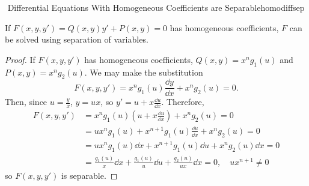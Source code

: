     \begin{theorem}{\Stop\,\,Differential Equations With Homogeneous Coefficients are Separable}{homodiffsep}
        
        If \(F(x,y,y')=Q(x,y)y'+P(x,y)=0\) has homogeneous coefficients, \(F\) can be solved using separation of variables.
        \begin{proof}
            If \(F(x,y,y')\) has homogeneous coefficients, \(Q(x,y)=x^ng_1(u)\) and \(P(x,y)=x^ng_2(u)\). We may make the substitution
            \begin{equation*}
                F(x,y,y')=x^ng_1(u)\frac{\dd y}{\dd x}+x^ng_2(u)=0.
            \end{equation*}
            Then, since \(u=\frac{y}{x}\), \(y=ux\), so \(y'=u+x\frac{\dd u}{\dd x}\). Therefore,
            \begin{align*}
                F(x,y,y')&=x^ng_1(u)\left(u+x\frac{\dd u}{\dd x}\right)+x^ng_2(u)=0 \\
                &=ux^ng_1(u)+x^{n+1}g_1(u)\frac{\dd u}{\dd x}+x^ng_2(u)=0 \\
                &=ux^ng_1(u)\dd x+x^{n+1}g_1(u)\dd u+x^ng_2(u)\dd x=0 \\
                &=\frac{g_1(u)}{x}\dd x+\frac{g_1(u)}{u}\dd u+\frac{g_2(u)}{ux}\dd x=0,\quad ux^{n+1}\neq0 
            \end{align*}
            \DOTHISLATER
            so \(F(x,y,y')\) is separable.
        \end{proof}

    \end{theorem}